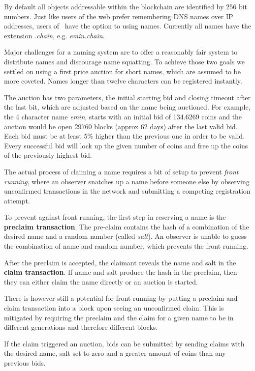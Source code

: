 By default all objects addressable within the blockchain are identified by
256 bit numbers. Just like users of the web prefer remembering DNS names over
IP addresses, users of \aet\ have the option to using names. Currently all
names have the extension \textit{.chain}, e.g. \textit{emin.chain}.

Major challenges for a naming system are to offer a reasonably fair system to
distribute names and discourage name squatting. To achieve those two goals we
settled on using a first price auction for short names, which are assumed to be
more coveted. Names longer than twelve characters can be registered instantly.

The auction has two parameters, the initial starting bid and closing timeout
after the last bit, which are adjusted based on the name being auctioned.
For example, the 4 character name \textit{emin}, starts with an initial
bid of 134.6269 coins and the auction would be open 29760 blocks (approx 62
days) after the last valid bid.
Each bid must be at least 5\% higher than the previous one in order to be
valid. Every successful bid will lock up the given number of coins and free
up the coins of the previously highest bid.

The actual process of claiming a name requires a bit of setup to prevent
\textit{front running}, where an observer snatches up a name before someone
else by observing unconfirmed transactions in the network and submitting a
competing registration attempt.

To prevent against front running, the first step in reserving a name is the
\textbf{preclaim transaction}. The pre-claim contains the hash of a combination
of the desired name and a random number (called \textit{salt}). An observer is
unable to guess the combination of name and random number, which prevents the
front running.

After the preclaim is accepted, the claimant reveals the name and salt in the
\textbf{claim transaction}. If name and salt produce the hash in the preclaim,
then they can either claim the name directly or an auction is started.

There is however still a potential for front running by putting a preclaim and
claim transaction into a block upon seeing an unconfirmed claim. This is
mitigated by requiring the preclaim and the claim for a given name to be in
different generations and therefore different blocks.

If the claim triggered an auction, bids can be submitted by sending claims with
the desired name, salt set to zero and a greater amount of coins than any
previous bids.

